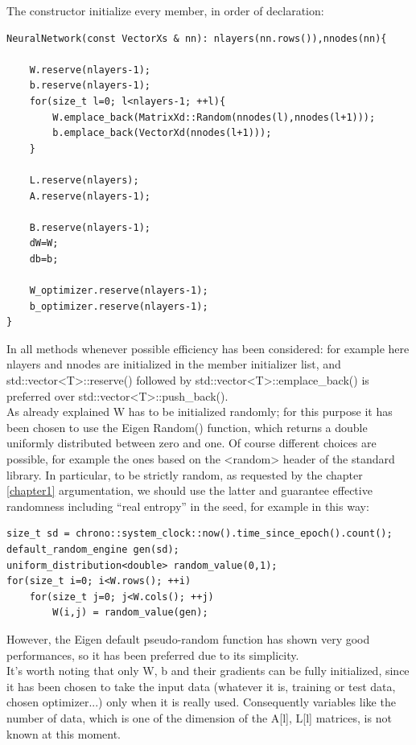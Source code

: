 \documentclass[12pt, a4paper]{report}
\theoremstyle{definition}
\begin{document}
The constructor initialize every member, in order of declaration:
\begin{lstlisting}[frame=single, showstringspaces=false]
NeuralNetwork(const VectorXs & nn): nlayers(nn.rows()),nnodes(nn){

	W.reserve(nlayers-1);
	b.reserve(nlayers-1);
	for(size_t l=0; l<nlayers-1; ++l){
		W.emplace_back(MatrixXd::Random(nnodes(l),nnodes(l+1)));	
		b.emplace_back(VectorXd(nnodes(l+1)));
	}

	L.reserve(nlayers);	
	A.reserve(nlayers-1);

	B.reserve(nlayers-1);	
	dW=W; 
	db=b; 

	W_optimizer.reserve(nlayers-1);
	b_optimizer.reserve(nlayers-1);
}
\end{lstlisting}
In all methods whenever possible efficiency has been considered: for example here {\ttfamily nlayers} and {\ttfamily nnodes} are initialized in the member initializer list, and {\ttfamily std::vector<T>::reserve()} followed by {\ttfamily std::vector<T>::emplace\_back()} is preferred over {\ttfamily std::vector<T>::push\_back()}.\\
As already explained {\ttfamily W} has to be initialized randomly; for this purpose it has been chosen to use the Eigen {\ttfamily Random()} function, which returns a double uniformly distributed between zero and one. Of course different choices are possible, for example the ones based on the {\ttfamily <random>} header of the standard library. In particular, to be strictly random, as requested by the chapter \ref{chapter1} argumentation, we should use the latter and guarantee effective randomness including ``real entropy'' in the seed, for example in this way:
\begin{lstlisting}[frame=single, showstringspaces=false]
size_t sd = chrono::system_clock::now().time_since_epoch().count();
default_random_engine gen(sd);
uniform_distribution<double> random_value(0,1);
for(size_t i=0; i<W.rows(); ++i)
	for(size_t j=0; j<W.cols(); ++j)
		W(i,j) = random_value(gen);
\end{lstlisting}
However, the Eigen default pseudo-random function has shown very good performances, so it has been preferred due to its simplicity.\\
It's worth noting that only {\ttfamily W}, {\ttfamily b} and their gradients can be fully initialized, since it has been chosen to take the input data (whatever it is, training or test data, chosen optimizer...) only when it is really used. Consequently variables like the number of data, which is one of the dimension of the {\ttfamily A[l], L[l]} matrices, is not known at this moment.\\
\end{document}
